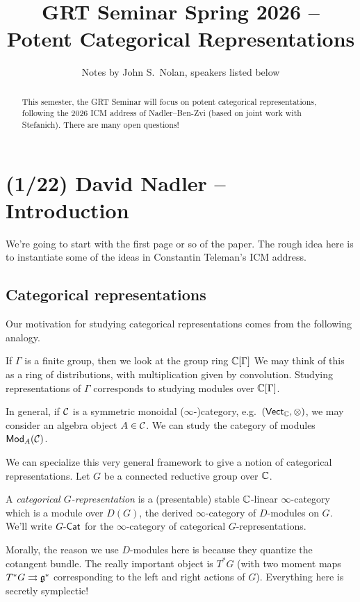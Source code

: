 \documentclass{article}
\title{GRT Seminar Spring 2026 -- Potent Categorical Representations}
\author{Notes by John S.\ Nolan, speakers listed below}
\begin{document}
\maketitle

\begin{abstract}
	This semester, the GRT Seminar will focus on potent categorical representations, following the 2026 ICM address of Nadler--Ben-Zvi (based on joint work with Stefanich).
  There are many open questions!
\end{abstract}

\tableofcontents

\section{(1/22) David Nadler -- Introduction}

We're going to start with the first page or so of the paper.
The rough idea here is to instantiate some of the ideas in Constantin Teleman's ICM address.

\subsection{Categorical representations}

Our motivation for studying categorical representations comes from the following analogy.

If $\Gamma$ is a finite group, then we look at the group ring $\mathbb{C}[\Gamma]$ 
We may think of this as a ring of distributions, with multiplication given by convolution.
Studying representations of $\Gamma$ corresponds to studying modules over $\mathbb{C}[\Gamma]$.

In general, if $\mathcal{C}$ is a symmetric monoidal ($\infty$-)category, e.g.\ $(\mathsf{Vect}_{\mathbb{C}}, \otimes)$, we may consider an algebra object $A \in \mathcal{C}$.
We can study the category of modules $\mathsf{Mod}_A(\mathcal{C})$.

We can specialize this very general framework to give a notion of categorical representations.
Let $G$ be a connected reductive group over $\mathbb{C}$.

\begin{dfn}
  A \emph{categorical $G$-representation} is a (presentable) stable $\mathbb{C}$-linear $\infty$-category which is a module over $D(G)$, the derived $\infty$-category of $D$-modules on $G$.
  We'll write $G\text{-}\mathsf{Cat}$ for the $\infty$-category of categorical $G$-representations.
\end{dfn}

\begin{rmk}
  Morally, the reason we use $D$-modules here is because they quantize the cotangent bundle.
  The really important object is $T^*G$ (with two moment maps $T^*G \rightrightarrows\mathfrak{g}^*$ corresponding to the left and right actions of $G$).
  Everything here is secretly symplectic!
\end{rmk}
\end{document}
